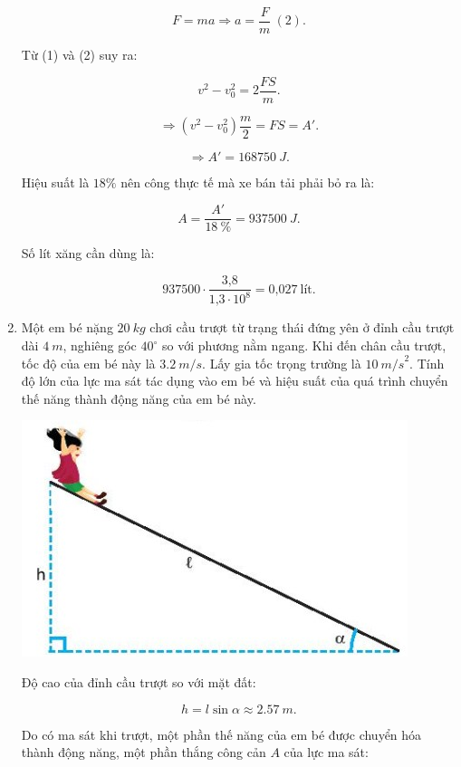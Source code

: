 \begin{enumerate}[label=\bfseries Câu \arabic*:, leftmargin=1.5cm]
{		$$F=ma \Rightarrow a= \dfrac{F}{m}\ (2).$$
		
		Từ (1) và (2) suy ra: 
		
		$$v^2-v_0^2= 2\dfrac{FS}{m}.$$
		
		$$\Rightarrow (v^2-v_0^2)\dfrac{m}{2}= FS= A'.$$
		
		$$\Rightarrow  A'=\SI{168750}{J}.$$
		
		Hiệu suất là $18\%$ nên công thực tế mà xe bán tải phải bỏ ra là:
		
		$$A= \dfrac{A'}{\SI{18}{\percent}}= \SI{937500}{J}.$$
		
		Số lít xăng cần dùng là:
		
		$$937500 \cdot \dfrac{\text{3,8}}{\text{1,3}\cdot 10^8} = \text{0,027}\ \text{lít}.$$
	}
	\item {}
	
	
	{
		Một em bé nặng $\SI{20}{kg}$ chơi cầu trượt từ trạng thái đứng yên ở đỉnh cầu trượt dài $\SI{4}{m}$, nghiêng góc $40^\circ$ so với phương nằm ngang. Khi đến chân cầu trượt, tốc độ của em bé này là $\SI{3,2}{m/s}$. Lấy gia tốc trọng trường là $\SI{10}{m/s}^2.$ Tính độ lớn của lực ma sát tác dụng vào em bé và hiệu suất của quá trình chuyển thế năng thành động năng của em bé này.
	}
	
	\hideall
	{	
		
		\begin{center}
			\includegraphics[scale=0.8]{../figs/VN10-2022-PH-TP030-1.jpg}
		\end{center}
		
		Độ cao của đỉnh cầu trượt so với mặt đất:
		
		$$ h = l\sin \alpha \approx \SI{2,57}{m}.$$
		
		Do có ma sát khi trượt, một phần thế năng của em bé được chuyển hóa thành động năng, một phần thắng công cản $A$ của lực ma sát:
		
}
\end{enumerate}

